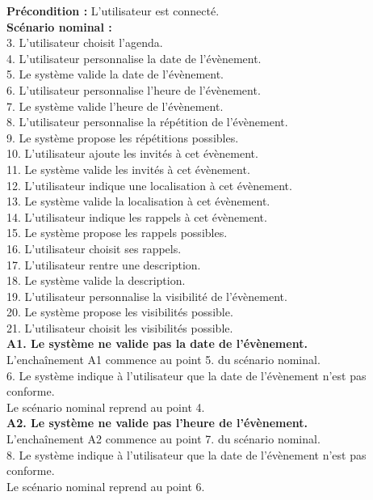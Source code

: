 \documentclass{article}
\begin{document}
\textbf{Précondition : } L'utilisateur est connecté.\\
\textbf{Scénario nominal :}\\
3. L'utilisateur choisit l'agenda.\\
4. L'utilisateur personnalise la date de l'évènement.\\
5. Le système valide la date de l'évènement.\\
6. L'utilisateur personnalise l'heure de l'évènement.\\
7. Le système valide l'heure de l'évènement.\\
8. L'utilisateur personnalise la répétition de l'évènement.\\
9. Le système propose les répétitions possibles.\\
10. L'utilisateur ajoute les invités à cet évènement.\\
11. Le système valide les invités à cet évènement.\\
12. L'utilisateur indique une localisation à cet évènement.\\
13. Le système valide la localisation à cet évènement.\\
14. L'utilisateur indique les rappels à cet évènement.\\
15. Le système propose les rappels possibles.\\
16. L'utilisateur choisit ses rappels.\\
17. L'utilisateur rentre une description.\\
18. Le système valide la description.\\
19. L'utilisateur personnalise la visibilité de l'évènement.\\
20. Le système propose les visibilités possible.\\
21. L'utilisateur choisit les visibilités possible.\\

\textbf{A1. Le système ne valide pas la date de l'évènement.}\\
L'enchaînement A1 commence au point 5. du scénario nominal.\\
6. Le système indique à l'utilisateur que la date de l'évènement n'est pas conforme.\\
Le scénario nominal reprend au point 4.\\

\textbf{A2. Le système ne valide pas l'heure de l'évènement.}\\
L'enchaînement A2 commence au point 7. du scénario nominal.\\
8. Le système indique à l'utilisateur que la date de l'évènement n'est pas conforme.\\
Le scénario nominal reprend au point 6.\\
\end{document}

